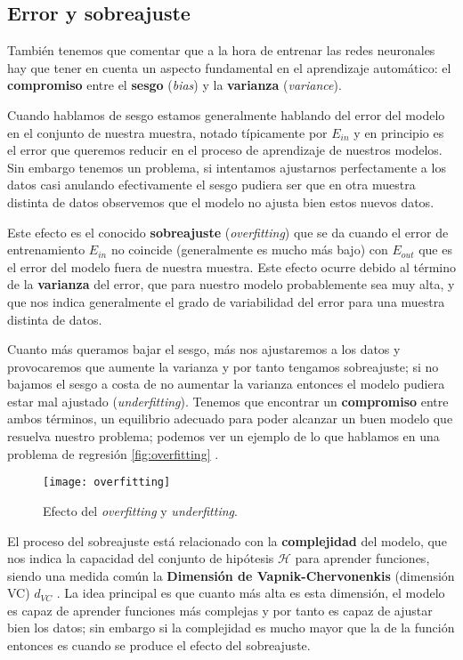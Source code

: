\subsection{Error y sobreajuste}

También tenemos que comentar que a la hora de entrenar las redes neuronales hay que tener en cuenta un aspecto fundamental en el aprendizaje automático: el \textbf{compromiso} entre el \textbf{sesgo} (\emph{bias}) y la \textbf{varianza} (\emph{variance}).

Cuando hablamos de sesgo estamos generalmente hablando del error del modelo en el conjunto de nuestra muestra, notado típicamente por $E_{in}$ y en principio es el error que queremos reducir en el proceso de aprendizaje de nuestros modelos. Sin embargo tenemos un problema, si intentamos ajustarnos perfectamente a los datos casi anulando efectivamente el sesgo pudiera ser que en otra muestra distinta de datos observemos que el modelo no ajusta bien estos nuevos datos.

Este efecto es el conocido \textbf{sobreajuste} (\emph{overfitting}) que se da cuando el error de entrenamiento $E_{in}$ no coincide (generalmente es mucho más bajo) con $E_{out}$ que es el error del modelo fuera de nuestra muestra. Este efecto ocurre debido al término de la \textbf{varianza} del error, que para nuestro modelo probablemente sea muy alta, y que nos indica generalmente el grado de variabilidad del error para una muestra distinta de datos.

Cuanto más queramos bajar el sesgo, más nos ajustaremos a los datos y provocaremos que aumente la varianza y por tanto tengamos sobreajuste; si no bajamos el sesgo a costa de no aumentar la varianza entonces el modelo pudiera estar mal ajustado (\emph{underfitting}). Tenemos que encontrar un \textbf{compromiso} entre ambos términos, un equilibrio adecuado para poder alcanzar un buen modelo que resuelva nuestro problema; podemos ver un ejemplo de lo que hablamos en una problema de regresión \autoref{fig:overfitting} \cite{bhande2018overfitting}.

\begin{figure}[htpb]
  \centering
  \texttt{[image: overfitting]}
  \caption{Efecto del \emph{overfitting} y \emph{underfitting}.}
  \label{fig:overfitting}
\end{figure}

El proceso del sobreajuste está relacionado con la \textbf{complejidad} del modelo, que nos indica la capacidad del conjunto de hipótesis $\mathcal{H}$ para aprender funciones, siendo una medida común
la \textbf{Dimensión de Vapnik-Chervonenkis} (dimensión VC) $d_{VC}$ \cite{vapnik2015uniform}.  La idea principal es que cuanto más alta es esta dimensión, el modelo es capaz de aprender funciones más complejas y por tanto es capaz de ajustar bien los datos; sin embargo si la complejidad es mucho mayor que la de la función entonces es cuando se produce el efecto del sobreajuste.

